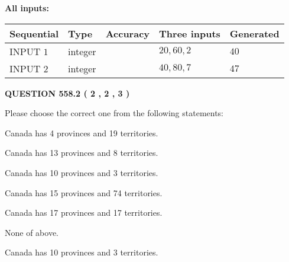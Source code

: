\documentclass[12pt]{article}
\begin{document}
   
   
   
\noindent{}
   
   
   
   
\noindent\vspace{0.1in}\hspace{-0.08in} {\textbf{\Large{All inputs: }}}
   
   
  
  
\noindent\begin{tabular}{|l|l|l|l|l|}
\hline
 Sequential & Type & Accuracy & Three inputs & Generated \\ 
\hline
 
 
  INPUT $  1 $ & integer &  & $
 20
 , 
 60
 , 
 2
 $ & $ 40 $ 
 \\  \hline  
 
 
  INPUT $  2 $ & integer &  & $
 40
 , 
 80
 , 
 7
 $ & $ 47 $ 
 \\  \hline  
 \end{tabular}
   
   
  
\vspace{0.2in}
  
{\textbf{\Large{QUESTION
558.2 
 ( 2 , 2 , 3 )
}}}
  
  
Please choose the correct one from the following statements:
 
 
Canada has   4 provinces and  19 territories.
 
 
Canada has  13 provinces and  8 territories.
 
 
Canada has 10  provinces and 3 territories.
 
 
Canada has  15 provinces and  74 territories.
 
 
Canada has  17 provinces and  17 territories.
 
 
 None of above.
 
 
\noindent{}
 
 
Canada has 10  provinces and 3 territories.
 
 
\noindent{}
 
 
   
\end{document}
